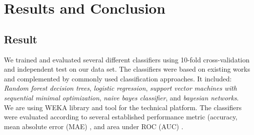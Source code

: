 \section{Results and Conclusion}
\label{sec:conclusion}

\subsection{Result}
\label{sec:results}

We trained and evaluated several different classifiers using 10-fold cross-validation and independent test on our data set. The classifiers were based on existing works and complemented by commonly used classification approaches. It included: \textit{Random forest decision trees}, \textit{logistic regression}, \textit{support vector machines with sequential minimal optimization}, \textit{naive bayes classifier}, and \textit{bayesian networks}. We are using WEKA library and tool for the technical platform. The classifiers were evaluated according to several established performance metric (accuracy, mean absolute error (MAE) \cite{willmott2005advantages}, and area under ROC (AUC) \cite{huang2005using}.

